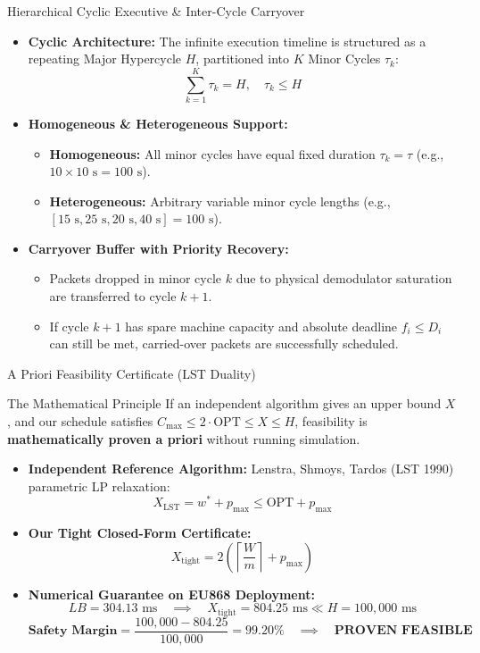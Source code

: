 \documentclass[aspectratio=169,10pt]{beamer}
\begin{document}
\begin{frame}{Hierarchical Cyclic Executive \& Inter-Cycle Carryover}
  \begin{itemize}
    \item \textbf{Cyclic Architecture:} The infinite execution timeline is structured as a repeating Major Hypercycle $H$, partitioned into $K$ Minor Cycles $\tau_k$:
    $$\sum_{k=1}^K \tau_k = H, \quad \tau_k \le H$$
    \item \textbf{Homogeneous \& Heterogeneous Support:}
    \begin{itemize}
      \item \textbf{Homogeneous:} All minor cycles have equal fixed duration $\tau_k = \tau$ (e.g., $10 \times 10\text{ s} = 100\text{ s}$).
      \item \textbf{Heterogeneous:} Arbitrary variable minor cycle lengths (e.g., $[15\text{ s}, 25\text{ s}, 20\text{ s}, 40\text{ s}] = 100\text{ s}$).
    \end{itemize}
    \item \textbf{Carryover Buffer with Priority Recovery:}
    \begin{itemize}
      \item Packets dropped in minor cycle $k$ due to physical demodulator saturation are transferred to cycle $k+1$.
      \item If cycle $k+1$ has spare machine capacity and absolute deadline $f_i \le D_i$ can still be met, carried-over packets are successfully scheduled.
    \end{itemize}
  \end{itemize}
\end{frame}

\begin{frame}{A Priori Feasibility Certificate (LST Duality)}
  \begin{alertblock}{The Mathematical Principle}
    If an independent algorithm gives an upper bound $X$, and our schedule satisfies $C_{\max} \le 2 \cdot \text{OPT} \le X \le H$, feasibility is \textbf{mathematically proven a priori} without running simulation.
  \end{alertblock}
  \begin{itemize}
    \item \textbf{Independent Reference Algorithm:} Lenstra, Shmoys, Tardos (LST 1990) parametric LP relaxation:
    $$X_{\text{LST}} = w^* + p_{\max} \le \text{OPT} + p_{\max}$$
    \item \textbf{Our Tight Closed-Form Certificate:}
    $$X_{\text{tight}} = 2 \left( \left\lceil \frac{W}{m} \right\rceil + p_{\max} \right)$$
    \item \textbf{Numerical Guarantee on EU868 Deployment:}
    $$LB = 304.13\text{ ms} \quad \implies \quad X_{\text{tight}} = 804.25\text{ ms} \ll H = 100{,}000\text{ ms}$$
    $$\textbf{Safety Margin} = \frac{100{,}000 - 804.25}{100{,}000} = \mathbf{99.20\%} \quad \implies \quad \textbf{PROVEN FEASIBLE}$$
  \end{itemize}
\end{frame}
\end{document}
